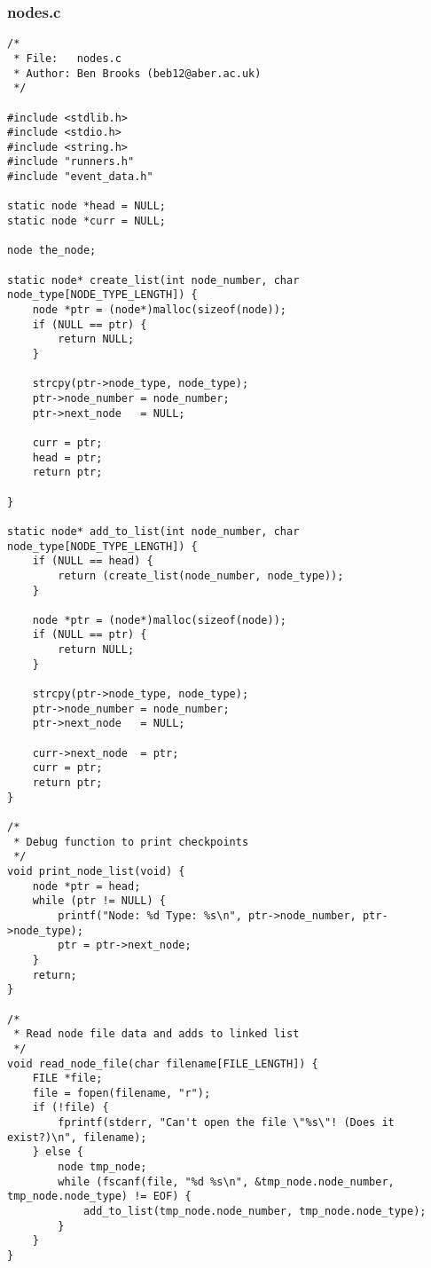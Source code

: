 \documentclass[pdftex,12pt,a4paper]{article}
\begin{document}
\subsubsection{nodes.c}
\begin{verbatim}
/*
 * File:   nodes.c
 * Author: Ben Brooks (beb12@aber.ac.uk)
 */

#include <stdlib.h>
#include <stdio.h>
#include <string.h>
#include "runners.h"
#include "event_data.h"

static node *head = NULL;
static node *curr = NULL;

node the_node;

static node* create_list(int node_number, char node_type[NODE_TYPE_LENGTH]) {
    node *ptr = (node*)malloc(sizeof(node));
    if (NULL == ptr) {
        return NULL;
    }

    strcpy(ptr->node_type, node_type);
    ptr->node_number = node_number;
    ptr->next_node   = NULL;

    curr = ptr;
    head = ptr;
    return ptr;

}

static node* add_to_list(int node_number, char node_type[NODE_TYPE_LENGTH]) {
    if (NULL == head) {
        return (create_list(node_number, node_type));
    }

    node *ptr = (node*)malloc(sizeof(node));
    if (NULL == ptr) {
        return NULL;
    }

    strcpy(ptr->node_type, node_type);
    ptr->node_number = node_number;
    ptr->next_node   = NULL;

    curr->next_node  = ptr;
    curr = ptr;
    return ptr;
}

/*
 * Debug function to print checkpoints
 */
void print_node_list(void) {
    node *ptr = head;
    while (ptr != NULL) {
        printf("Node: %d Type: %s\n", ptr->node_number, ptr->node_type);
        ptr = ptr->next_node;
    }
    return;
}

/*
 * Read node file data and adds to linked list
 */
void read_node_file(char filename[FILE_LENGTH]) {
    FILE *file;
    file = fopen(filename, "r");
    if (!file) {
        fprintf(stderr, "Can't open the file \"%s\"! (Does it exist?)\n", filename);
    } else {
        node tmp_node;
        while (fscanf(file, "%d %s\n", &tmp_node.node_number, tmp_node.node_type) != EOF) {
            add_to_list(tmp_node.node_number, tmp_node.node_type);
        }
    }
}
\end{verbatim}
\end{document}
